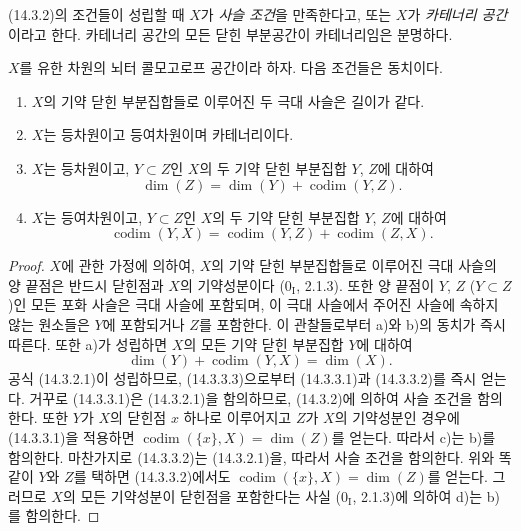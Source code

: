 (14.3.2)의 조건들이 성립할 때 $X$가 \emph{사슬 조건}을 만족한다고,
또는 $X$가 \emph{카테너리 공간}이라고 한다. 카테너리 공간의 모든
닫힌 부분공간이 카테너리임은 분명하다.

\begin{proposition}[14.3.3]
\label{0.14.3.3-fr}
$X$를 유한 차원의 뇌터 콜모고로프 공간이라 하자. 다음 조건들은
동치이다.
\begin{enumerate}
  \item[\rm(a)] $X$의 기약 닫힌 부분집합들로 이루어진 두 극대 사슬은
  길이가 같다.
  \item[\rm(b)] $X$는 등차원이고 등여차원이며 카테너리이다.
  \item[\rm(c)] $X$는 등차원이고, $Y\subset Z$인 $X$의 두 기약 닫힌
  부분집합 $Y$, $Z$에 대하여
  \[
    \dim(Z)=\dim(Y)+\operatorname{codim}(Y,Z).
    \tag{14.3.3.1}\label{0.14.3.3.1-fr}
  \]
  \item[\rm(d)] $X$는 등여차원이고, $Y\subset Z$인 $X$의 두 기약
  닫힌 부분집합 $Y$, $Z$에 대하여
  \[
    \operatorname{codim}(Y,X)=
    \operatorname{codim}(Y,Z)+\operatorname{codim}(Z,X).
    \tag{14.3.3.2}\label{0.14.3.3.2-fr}
  \]
\end{enumerate}
\end{proposition}

\begin{proof}
$X$에 관한 가정에 의하여, $X$의 기약 닫힌 부분집합들로 이루어진 극대
사슬의 양 끝점은 반드시 닫힌점과 $X$의 기약성분이다
($0_{\mathrm I}$, 2.1.3). 또한 양 끝점이 $Y$, $Z$ ($Y\subset Z$)인
모든 포화 사슬은 극대 사슬에 포함되며, 이 극대 사슬에서 주어진 사슬에
속하지 않는 원소들은 $Y$에 포함되거나 $Z$를 포함한다. 이 관찰들로부터
a)와 b)의 동치가 즉시 따른다. 또한 a)가 성립하면 $X$의 모든 기약
닫힌 부분집합 $Y$에 대하여
\[
  \dim(Y)+\operatorname{codim}(Y,X)=\dim(X).
  \tag{14.3.3.3}\label{0.14.3.3.3-fr}
\]
공식 (14.3.2.1)이 성립하므로, (14.3.3.3)으로부터 (14.3.3.1)과
(14.3.3.2)를 즉시 얻는다. 거꾸로 (14.3.3.1)은 (14.3.2.1)을
함의하므로, (14.3.2)에 의하여 사슬 조건을 함의한다. 또한 $Y$가
$X$의 닫힌점 $x$ 하나로 이루어지고 $Z$가 $X$의 기약성분인 경우에
(14.3.3.1)을 적용하면
$\operatorname{codim}(\{x\},X)=\dim(Z)$를 얻는다. 따라서 c)는 b)를
함의한다. 마찬가지로 (14.3.3.2)는 (14.3.2.1)을, 따라서 사슬 조건을
함의한다. 위와 똑같이 $Y$와 $Z$를 택하면 (14.3.3.2)에서도
$\operatorname{codim}(\{x\},X)=\dim(Z)$를 얻는다. 그러므로 $X$의
모든 기약성분이 닫힌점을 포함한다는 사실 ($0_{\mathrm I}$, 2.1.3)에
의하여 d)는 b)를 함의한다.
\end{proof}

